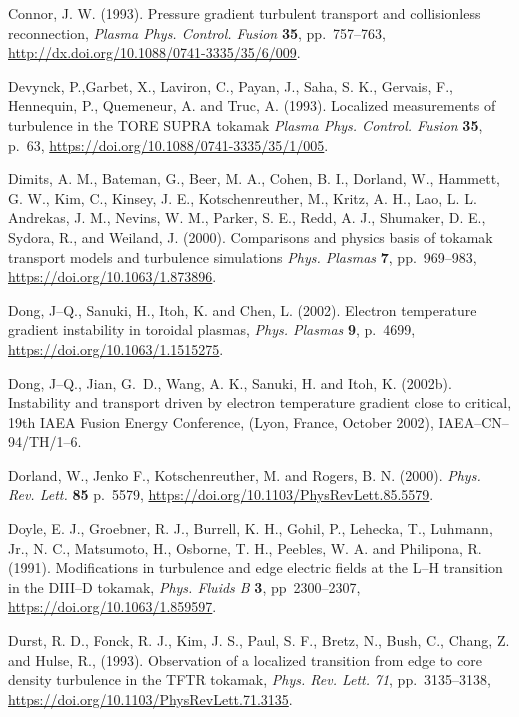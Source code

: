 \documentclass[a4paper,openany,12pt]{book}
\begin{document}
{\begin{thebibliography}{100}
\bibitem{}
Connor, J. W. (1993). Pressure gradient turbulent transport and collisionless reconnection, \emph{Plasma Phys. Control. Fusion} \textbf{35}, pp.~757--763, \url{http://dx.doi.org/10.1088/0741-3335/35/6/009}.

\bibitem{}
Devynck, P.,Garbet, X., Laviron, C., Payan, J., Saha, S. K., Gervais, F., Hennequin, P., Quemeneur, A. and Truc, A. (1993). Localized measurements of turbulence in the TORE SUPRA tokamak
{\em Plasma Phys. Control. Fusion} \textbf{35}, p.~63, 
\url{https://doi.org/10.1088/0741-3335/35/1/005}.

\bibitem{}
Dimits, A. M., Bateman, G., Beer, M. A., Cohen, B. I., Dorland, W., Hammett, G. W., Kim, C., Kinsey, J. E., Kotschenreuther, M., Kritz, A. H., Lao, L. L. Andrekas, J. M., Nevins, W. M., Parker, S. E., Redd, A. J., Shumaker, D. E., Sydora, R., and Weiland, J. (2000). Comparisons and physics basis of tokamak transport models and turbulence simulations \emph{Phys. Plasmas} \textbf{7}, pp.~969--983, \url{https://doi.org/10.1063/1.873896}.

\bibitem{}
Dong, J--Q., Sanuki, H., Itoh, K. and Chen, L. (2002). Electron temperature gradient instability in toroidal plasmas, 
{\em Phys. Plasmas} \textbf{9}, p.~4699, \url{https://doi.org/10.1063/1.1515275}.

\bibitem{}
 Dong, J--Q., Jian, G.~D., Wang, A. K., Sanuki, H. and Itoh, K. (2002b). Instability and transport driven by electron temperature gradient close to critical, 19th IAEA Fusion Energy Conference, (Lyon, France, October 2002), IAEA--CN--94/TH/1--6.

\bibitem{}
Dorland, W., Jenko F., Kotschenreuther, M. and Rogers, B. N. (2000). \emph{Phys. Rev. Lett.} \textbf{85} p.~5579, \url{https://doi.org/10.1103/PhysRevLett.85.5579}.

\bibitem{}
Doyle, E. J., Groebner, R. J., Burrell, K. H., Gohil, P., Lehecka, T., Luhmann, Jr., N. C., Matsumoto, H., Osborne, T. H., Peebles, W. A. and Philipona, R. (1991). Modifications in turbulence and edge electric fields at the L--H transition in the DIII--D tokamak, \emph{Phys. Fluids B} \textbf{3}, pp~2300--2307,
\url{https://doi.org/10.1063/1.859597}.

\bibitem{}
Durst, R. D., Fonck, R. J., Kim, J. S., Paul, S. F., Bretz, N., Bush, C., Chang, Z. and Hulse, R., (1993). Observation of a localized transition from edge to core density turbulence in the TFTR tokamak,  {\em Phys. Rev. Lett.} \emph{71}, 
pp.~3135--3138, \url{https://doi.org/10.1103/PhysRevLett.71.3135}.


\end{thebibliography}}
\end{document}

